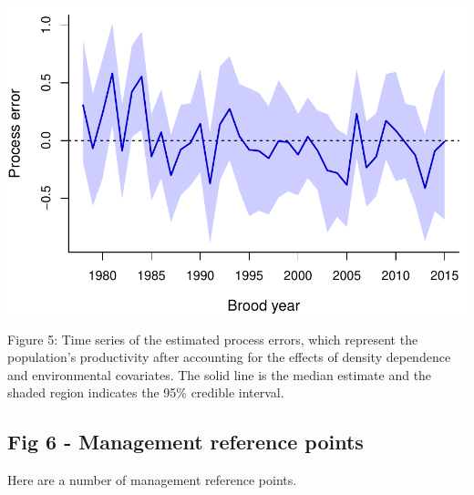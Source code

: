 \documentclass[
  11pt,
]{article}
\begin{document}
\begin{center}\includegraphics{App_3_Summarize_results_files/figure-latex/fig_5_proc_err-1} \end{center}

Figure 5: Time series of the estimated process errors, which represent
the population's productivity after accounting for the effects of
density dependence and environmental covariates. The solid line is the
median estimate and the shaded region indicates the 95\% credible
interval.

\hypertarget{fig-6---management-reference-points}{%
\subsection{Fig 6 - Management reference
points}\label{fig-6---management-reference-points}}

Here are a number of management reference points.
\end{document}
